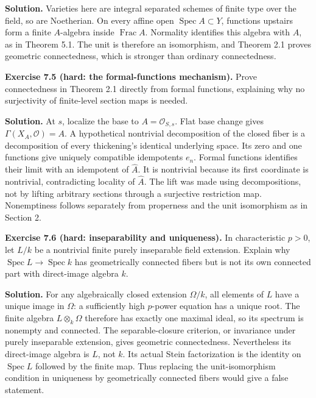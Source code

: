 \documentclass[11pt]{article}
\begin{document}
\textbf{Solution.} Varieties here are integral separated schemes of
finite type over the field, so are Noetherian. On every affine open
\(\operatorname{Spec}A\subset Y\), functions upstairs form a finite
\(A\)-algebra inside \(\operatorname{Frac}A\). Normality identifies this
algebra with \(A\), as in Theorem 5.1. The unit is therefore an
isomorphism, and Theorem 2.1 proves geometric connectedness, which is
stronger than ordinary connectedness.

\textbf{Exercise 7.5 (hard: the formal-functions mechanism).} Prove
connectedness in Theorem 2.1 directly from formal functions, explaining
why no surjectivity of finite-level section maps is needed.

\textbf{Solution.} At \(s\), localize the base to
\(A=\mathcal O_{S,s}\). Flat base change gives
\(\Gamma(X_A,\mathcal O)=A\). A hypothetical nontrivial decomposition of
the closed fiber is a decomposition of every thickening's identical
underlying space. Its zero and one functions give uniquely compatible
idempotents \(e_n\). Formal functions identifies their limit with an
idempotent of \(\widehat A\). It is nontrivial because its first
coordinate is nontrivial, contradicting locality of \(\widehat A\). The
lift was made using decompositions, not by lifting arbitrary sections
through a surjective restriction map. Nonemptiness follows separately
from properness and the unit isomorphism as in Section 2.

\textbf{Exercise 7.6 (hard: inseparability and uniqueness).} In
characteristic \(p>0\), let \(L/k\) be a nontrivial finite purely
inseparable field extension. Explain why
\(\operatorname{Spec}L\to\operatorname{Spec}k\) has geometrically
connected fibers but is not its own connected part with direct-image
algebra \(k\).

\textbf{Solution.} For any algebraically closed extension \(\Omega/k\),
all elements of \(L\) have a unique image in \(\Omega\): a sufficiently
high \(p\)-power equation has a unique root. The finite algebra
\(L\otimes_k\Omega\) therefore has exactly one maximal ideal, so its
spectrum is nonempty and connected. The separable-closure criterion, or
invariance under purely inseparable extension, gives geometric
connectedness. Nevertheless its direct-image algebra is \(L\), not
\(k\). Its actual Stein factorization is the identity on
\(\operatorname{Spec}L\) followed by the finite map. Thus replacing the
unit-isomorphism condition in uniqueness by geometrically connected
fibers would give a false statement.
\end{document}
